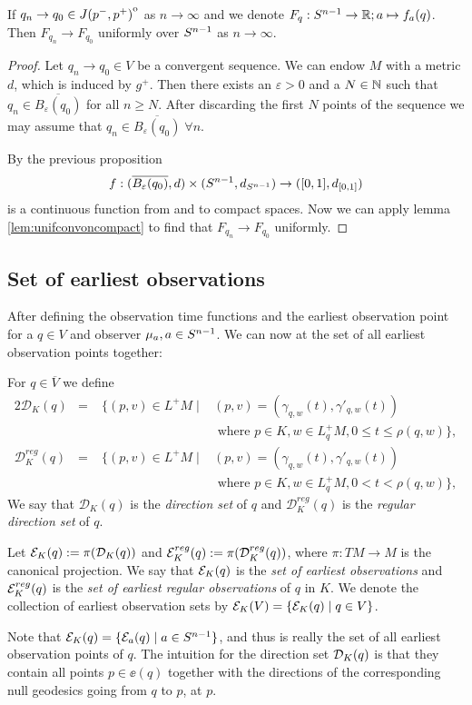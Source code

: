 \begin{proposition}\label{prop:funif}
    If $q_n \to q_0\in {\kern0ptJ(p^-,p^+)}^{\mathrm{o}}$ as $n\to \infty$ and we denote $F_q:{S^{n-1}}\to\mathbb{R};a\mapsto f_a(q)$. Then $F_{q_n}\to F_{q_0}$ uniformly over ${S^{n-1}}$ as $n\to \infty$.
\end{proposition}
\begin{proof}
    Let $q_n \to q_0 \in V$ be a convergent sequence. We can endow $M$ with a metric $d$, which is induced by $g^+$. Then there exists an $\varepsilon>0$ and a $N\in \mathbb{N}$ such that $q_n\in \overline{B_\varepsilon(q_0)}$ for all $n\ge N$. After discarding the first $N$ points of the sequence we may assume that $q_n \in \overline{B_\varepsilon(q_0)} \; \forall n$.

    By the previous proposition 
    \begin{align*}
        f:(\overline{B_\varepsilon(q_0)},d)\times({S^{n-1}}, d_{{S^{n-1}}}) \to ([0,1],d_{[0,1]})
    \end{align*} is a continuous function from and to compact spaces. Now we can apply lemma \ref{lem:unifconvoncompact} to find that $F_{q_n}\to F_{q_0}$ uniformly.
     
\end{proof}

\subsection{Set of earliest observations}
After defining the observation time functions and the earliest observation point for a $q\in V$ and observer $\mu_a, a\in {S^{n-1}}$. We can now at the set of all earliest observation points together:
\begin{definition}
For $q\in \overline{V}$ we define
\begin{alignat*}{2}
    \mathcal{D}_K(q) &=\; &\{(p,v)\in L^+M \mid &(p,v) = (\gamma_{q,w}(t),\gamma'_{q,w}(t)) \\
    &&&\text{ where } p\in K, w\in L_q^+M, 0\leq t \leq \rho(q,w)\},\\
    \mathcal{D}^{reg}_K(q) &=\; &\{(p,v)\in L^+M \mid &(p,v) = (\gamma_{q,w}(t),\gamma'_{q,w}(t)) \\
    &&&\text{ where } p\in K, w\in L_q^+M, 0 < t < \rho(q,w)\},
\end{alignat*}
We say that $\mathcal{D}_K(q)$ is the \emph{direction set} of $q$ and $\mathcal{D}^{reg}_K(q)$ is the \emph{regular direction set} of $q$.

Let ${\mathcal{E}}_K(q) := \pi(\mathcal{D}_K(q))$ and ${\mathcal{E}}^{reg}_K(q) := \pi(\mathcal{D}^{reg}_K(q))$, where $\pi:TM\to M$ is the canonical projection. We say that ${\mathcal{E}}_K(q)$ is the \emph{set of earliest observations} and ${\mathcal{E}}^{reg}_K(q)$ is the \emph{set of earliest regular observations} of $q$ in $K$. We denote the collection of earliest observation sets by ${\mathcal{E}}_K(V) = \{ {\mathcal{E}}_K(q) \mid q\in V\}$.
\end{definition}
Note that ${\mathcal{E}}_K(q) = \{ {\mathcal{E}}_a(q) \mid a\in {S^{n-1}} \}$, and thus is really the set of all earliest observation points of $q$. The intuition for the direction set ${\mathcal{D}}_K(q)$ is that they contain all points $p\in \ee(q)$ together with the directions of the corresponding null geodesics going from $q$ to $p$, at $p$.


